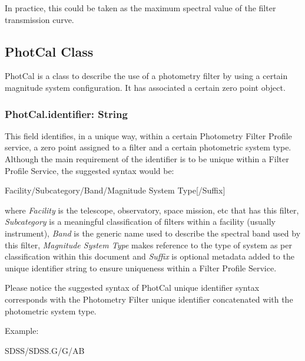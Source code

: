 \documentclass[11pt,a4paper]{ivoa}
\begin{document}
In practice, this could be taken as the maximum spectral value of the filter transmission
curve.\par

\subsection{PhotCal Class}
PhotCal is a class to describe the use of a photometry filter by using a certain magnitude system
configuration. It has associated a certain zero point object.
\par

\subsubsection{PhotCal.identifier: String}
This field identifies, in a unique way, within a certain Photometry Filter Profile
service, a zero point assigned to a filter and a certain photometric system type.
Although the main requirement of the identifier is to be unique within a Filter
Profile Service, the suggested syntax would be:
\par

Facility/Subcategory/Band/Magnitude System Type[/Suffix]
\bigskip


where \textit{Facility} is the telescope, observatory, space mission, etc that
has this filter, \textit{Subcategory} is a meaningful classification of filters
within a facility (usually instrument), \textit{Band} is the generic name used to
describe the spectral band used by this filter, \textit{Magnitude System Type}
makes reference to the type of system as per classification within this document
and \textit{Suffix} is optional metadata added to the unique identifier string to
ensure uniqueness within a Filter Profile Service.
\par

Please notice the suggested syntax of PhotCal unique identifier syntax corresponds
with the Photometry Filter unique identifier concatenated with the photometric
system type.
\par

Example:
\par



SDSS/SDSS.G/G/AB
\bigskip


\end{document}
